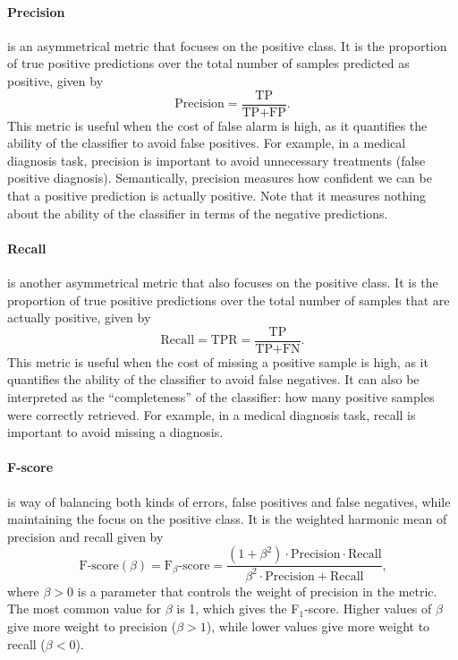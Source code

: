 \paragraph{Precision} is an asymmetrical metric that focuses on the positive class.  It is
the proportion of true positive predictions over the total number of samples predicted as
positive, given by
\begin{equation*}
  \text{Precision} = \frac{\text{TP}}{\text{TP} + \text{FP}}\text{.}
\end{equation*}
This metric is useful when the cost of false alarm is high, as it quantifies the
ability of the classifier to avoid false positives.  For example, in a medical diagnosis
task, precision is important to avoid unnecessary treatments (false positive diagnosis).
Semantically, precision measures how confident we can be that a positive prediction is
actually positive.  Note that it measures nothing about the ability of the classifier in
terms of the negative predictions.

\paragraph{Recall} is another asymmetrical metric that also focuses on the positive class.
It is the proportion of true positive predictions over the total number of
samples that are actually positive, given by
\begin{equation*}
  \text{Recall} = \text{TPR} = \frac{\text{TP}}{\text{TP} + \text{FN}}\text{.}
\end{equation*}
This metric is useful when the cost of missing a positive sample is high, as it quantifies the
ability of the classifier to avoid false negatives.  It can also be interpreted as the
``completeness'' of the classifier: how many positive samples were correctly retrieved.
For example, in a medical diagnosis task, recall is important to avoid missing a
diagnosis.

\paragraph{F-score} is way of balancing both kinds of errors, false positives and false
negatives, while maintaining the focus on the positive class. It is the weighted harmonic
mean of precision and recall given by
\begin{equation*}
  \text{F-score}(\beta) = \text{F}_\beta\text{-score} =
    \frac%
      {(1 + \beta^2) \cdot \text{Precision} \cdot \text{Recall}}
      {\beta^2 \cdot \text{Precision} + \text{Recall}}\text{,}
\end{equation*}
where $\beta > 0$ is a parameter that controls the weight of precision in the metric.
The most common value for $\beta$ is 1, which gives the F$_1$-score.  Higher values of
$\beta$ give more weight to precision ($\beta > 1$), while lower values give more weight
to recall ($\beta < 0$).

